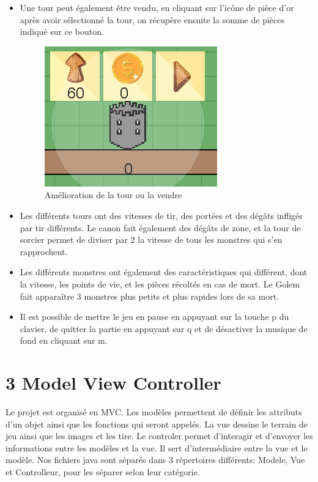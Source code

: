 \documentclass{report}
\begin{document}
\begin{itemize}
  \item Une tour peut également être vendu, en cliquant sur l'icône de pièce d'or après avoir sélectionné la tour, on récupère ensuite la somme de pièces indiqué sur ce bouton.
  \begin{figure}[!ht]
	\centering
	\includegraphics[scale=.5]{AmeliorationTour}
	\caption{Amélioration de la tour ou la vendre}
	\end{figure}
  \item Les différents tours ont des vitesses de tir, des portées et des dégâts infligés par tir différents. Le canon fait également des dégâts de zone, et la tour de sorcier permet de diviser par 2 la vitesse de tous les monstres qui s'en rapprochent.
  \item Les différents monstres ont également des caractéristiques qui différent, dont la vitesse, les points de vie, et les pièces récoltés en cas de mort. Le Golem fait apparaître 3 monstres plus petits et plus rapides lors de sa mort.
  \item Il est possible de mettre le jeu en pause en appuyant sur la touche p du clavier, de quitter la partie en appuyant sur q et de désactiver la musique de fond en cliquant sur m.
 
\end{itemize}
  
\section*{3 Model View Controller}

Le projet est organisé en MVC. Les modèles permettent de définir les attributs d’un objet ainsi que les fonctions qui seront appelés. La vue dessine le terrain de jeu ainsi que les images et les tire. Le controler permet d’interagir et d’envoyer les informations entre les modèles et la vue. Il sert d’intermédiaire entre la vue et le modèle.
Nos fichiers java sont séparés dans 3 répertoires différents: Modele, Vue et Controlleur, pour les séparer selon leur catégorie.
\end{document}
